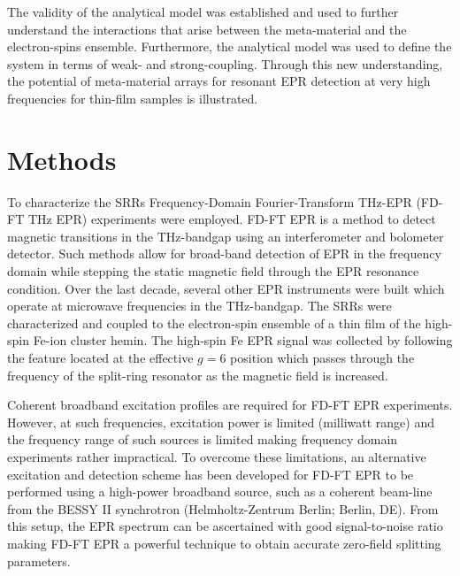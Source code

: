 The validity of the analytical model was established and used to further understand the interactions that arise between the meta-material and the electron-spins ensemble. Furthermore, the analytical model was used to define the system in terms of weak- and strong-coupling. Through this new understanding, the potential of meta-material arrays for resonant EPR detection at very high frequencies for thin-film samples is illustrated. 

\section{Methods}
To characterize the SRRs Frequency-Domain Fourier-Transform THz-EPR (FD-FT THz EPR) experiments were employed. FD-FT EPR is a method to detect magnetic transitions in the THz-bandgap using an interferometer and bolometer detector. \cite{Schnegg09,NEHRKORN201710} Such methods allow for broad-band detection of EPR in the frequency domain while stepping the static magnetic field through the EPR resonance condition. Over the last decade, several other EPR instruments were built which operate at microwave frequencies in the THz-bandgap. \cite{Disselhorst95, Hassan00, vanTol05, Zvyagin09, Takahashi09, C7CP07443C, Lu2017} The SRRs were characterized and coupled to the electron-spin ensemble of a thin film of the high-spin Fe-ion cluster hemin. The high-spin Fe EPR signal was collected by following the feature located at the effective $g=6$ position which passes through the frequency of the split-ring resonator as the magnetic field is increased. 

Coherent broadband excitation profiles are required for FD-FT EPR experiments. However, at such frequencies, excitation power is limited (milliwatt range) and the frequency range of such sources is limited making frequency domain experiments rather impractical. To overcome these limitations, an alternative excitation and detection scheme has been developed for FD-FT EPR to be performed using a high-power broadband source, such as a coherent beam-line from the BESSY II synchrotron (Helmholtz-Zentrum Berlin; Berlin, DE). From this setup, the EPR spectrum can be ascertained with good signal-to-noise ratio making FD-FT EPR a powerful technique to obtain accurate zero-field splitting parameters. \cite{Nehrkorn13,Nehrkorn15,NEHRKORN201710}


